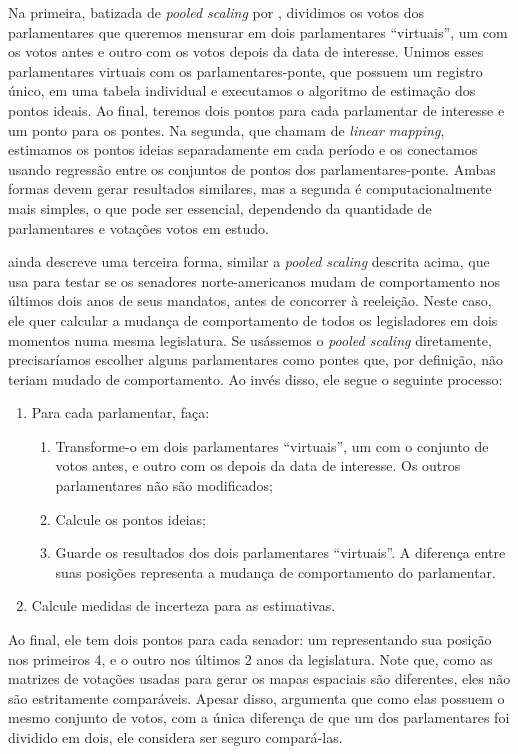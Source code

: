 Na primeira, batizada de \emph{pooled scaling} por ,
dividimos os votos dos parlamentares que queremos mensurar em dois
parlamentares ``virtuais'', um com os votos antes e outro com os votos depois
da data de interesse. Unimos esses parlamentares virtuais com os
parlamentares-ponte, que possuem um registro único, em uma tabela individual e
executamos o algoritmo de estimação dos pontos ideais. Ao final, teremos dois
pontos para cada parlamentar de interesse e um ponto para os pontes. Na
segunda, que  chamam de \emph{linear mapping}, estimamos
os pontos ideias separadamente em cada período e os conectamos usando regressão
entre os conjuntos de pontos dos parlamentares-ponte. Ambas formas devem gerar
resultados similares, mas a segunda é computacionalmente mais simples, o que
pode ser essencial, dependendo da quantidade de parlamentares e votações votos
em estudo.

 ainda descreve uma terceira forma, similar a
\emph{pooled scaling} descrita acima, que usa para testar se os senadores
norte-americanos mudam de comportamento nos últimos dois anos de seus mandatos,
antes de concorrer à reeleição. Neste caso, ele quer calcular a mudança de
comportamento de todos os legisladores em dois momentos numa mesma legislatura.
Se usássemos o \emph{pooled scaling} diretamente, precisaríamos escolher alguns
parlamentares como pontes que, por definição, não teriam mudado de
comportamento. Ao invés disso, ele segue o seguinte processo:

\begin{enumerate}
  \item Para cada parlamentar, faça:
    \begin{enumerate}
      \item Transforme-o em dois parlamentares ``virtuais'', um com o conjunto
de votos antes, e outro com os depois da data de interesse. Os outros
parlamentares não são modificados;
      \item Calcule os pontos ideias;
      \item Guarde os resultados dos dois parlamentares ``virtuais''. A
diferença entre suas posições representa a mudança de comportamento do
parlamentar.
    \end{enumerate}
  \item Calcule medidas de incerteza para as estimativas.
\end{enumerate}

Ao final, ele tem dois pontos para cada senador: um representando sua posição
nos primeiros 4, e o outro nos últimos 2 anos da legislatura. Note que, como as
matrizes de votações usadas para gerar os mapas espaciais são diferentes, eles
não são estritamente comparáveis. Apesar disso, 
argumenta que como elas possuem o mesmo conjunto de votos, com a única
diferença de que um dos parlamentares foi dividido em dois, ele considera ser
seguro compará-las.

